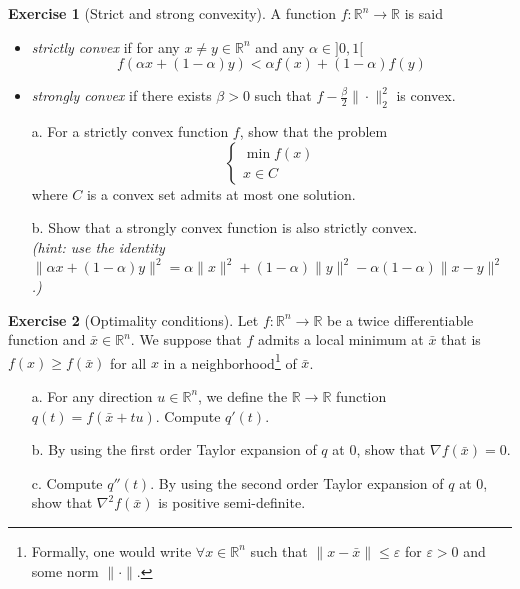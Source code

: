 \documentclass[a4paper,twoside,10pt]{amsart}
\numberwithin{equation}{section} %
\numberwithin{figure}{section} %
\numberwithin{table}{section} %
\theoremstyle{definition}
\newtheorem{q_td}{Exercise }
\begin{document}
\begin{q_td}[Strict and strong convexity]
\label{td:qp} A function $f:\mathbb{R}^n \to \mathbb{R}$ is said
\begin{itemize}
\item \emph{strictly convex} if for any $x \neq y \in\mathbb{R}^n$ and any $\alpha\in]0,1[$
$$ f(\alpha x + (1- \alpha )y ) < \alpha f(x) + (1- \alpha )f(y) $$
\item \emph{strongly convex} if there exists $\beta>0$ such that $f - \frac{\beta}{2}\|\cdot\|_2^2$ is convex.
\end{itemize}
\begin{itemize}
\item[a.] For a strictly convex function $f$, show that the problem
$$ \left\{ \begin{array}{l} \min f(x) \\ x \in C \end{array} \right. $$
where $C$ is a convex set admits at most one solution.
\item[b.] Show that a strongly convex function is also strictly convex.\\ \emph{(hint: use the identity $\|\alpha x + (1-\alpha)y\|^2 = \alpha \|x\|^2 + (1-\alpha)\|y\|^2 - \alpha (1-\alpha)\|x-y\|^2 $.)}
\end{itemize}
\end{q_td}

\vspace*{0.5cm}


\begin{q_td}[Optimality conditions]
\label{td:opt}
Let $f:\mathbb{R}^n\to\mathbb{R}$ be a twice differentiable function and $\bar{x}\in\mathbb{R}^n$. We suppose that $f$ admits a local minimum at $\bar{x}$ that is $f(x)\geq f(\bar{x})$ for all $x$ in a neighborhood\footnote{Formally, one would write $\forall x \in \mathbb{R}^n$ such that $\|x-\bar{x}\|\leq \varepsilon$ for $\varepsilon>0$ and some norm $\|\cdot\|$. } of $\bar{x}$.
\begin{itemize}
\item[a.] For any direction $u\in\mathbb{R}^n$, we define the $\mathbb{R}\to\mathbb{R}$ function $q(t) = f(\bar{x}+tu)$. Compute $q'(t)$.
\item[b.] By using the first order Taylor expansion of $q$ at $0$, show that $\nabla f(\bar{x}) = 0$.
\item[c.] Compute $q''(t)$. By using the second order Taylor expansion of $q$ at $0$, show that $\nabla^2 f(\bar{x})$ is positive semi-definite.
\end{itemize}
\end{q_td}
\end{document}
